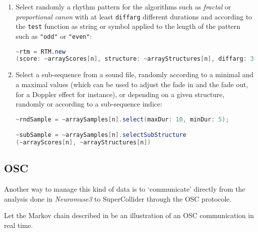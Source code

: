 \begin{enumerate}
    \item Select randomly a rhythm pattern for the algorithms such as \textsl{fractal} or \textsl{proportional canon} with at least \texttt{diffarg} different durations and according to the \texttt{test} function as string or symbol applied to the length of the pattern such as \texttt{"odd"} or \texttt{"even"}:
    
    \smallskip
    
\begin{lstlisting}[basicstyle=\footnotesize\ttfamily,language=Java]
~rtm = RTM.new
(score: ~arrayScores[n], structure: ~arrayStructures[n], diffarg: 3, test: \odd, limit: 10);	
\end{lstlisting}  
 \item Select a sub-sequence from a sound file, randomly according to a minimal and a maximal values (which can be used to adjust the fade in and the fade out, for a Doppler effect for instance), or depending on a given structure,  randomly or according to a sub-sequence indice:
 
 \smallskip
 
 \begin{lstlisting}[basicstyle=\footnotesize\ttfamily,language=Java]
~rndSample = ~arraySamples[n].select(maxDur: 10, minDur: 5);

~subSample = ~arraySamples[n].selectSubStructure
(~arrayScores[n], ~arrayStructures[n])
\end{lstlisting}  
\end{enumerate}

\subsection{OSC}
\label{osc}

Another way to manage this kind of data is to `communicate' directly from the analysis done in \textsl{Neuromuse3} to SuperCollider through the OSC protocole.

\smallskip

Let the Markov chain described in 
 be an illustration of an OSC communication in real time.
 
 \smallskip
 
